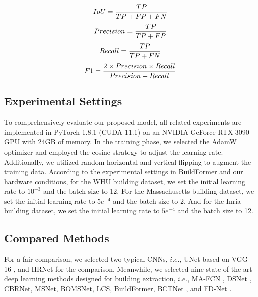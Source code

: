 \documentclass[lettersize,journal]{IEEEtran}
\begin{document}
\begin{equation}
\centering
	\label{iou} 
	\begin{split}
 IoU = \frac{TP}{TP + FP + FN}
	\end{split}
\end{equation}
\vspace{-1.0em}
\begin{equation}
\centering
	\label{Pre} 
	\begin{split}
 Precision = \frac{TP}{TP + FP}
	\end{split}
\end{equation}
\vspace{-1.0em}
\begin{equation}
\centering
	\label{Recall} 
	\begin{split}
 Recall = \frac{TP}{TP + FN}
	\end{split}
\end{equation}
\vspace{-1.0em}
\begin{equation}
\centering
	\label{F1} 
	\begin{split}
 F1 = \frac{2 \times Precision \times Recall}{Precision + Recall}
	\end{split}
\end{equation}
\vspace{-1.0em}

\subsection{Experimental Settings}
To comprehensively evaluate our proposed model, all related experiments are implemented in PyTorch 1.8.1 (CUDA 11.1) on an NVIDIA GeForce RTX 3090 GPU with 24GB of memory. In the training phase, we selected the AdamW \cite{AdamW} optimizer and employed the cosine strategy to adjust the learning rate. Additionally, we utilized random horizontal and vertical flipping to augment the training data. According to the experimental settings in BuildFormer \cite{BuildFormer} and our hardware conditions, for the WHU building dataset, we set the initial learning rate to $10^{-3}$ and the batch size to 12. For the Massachusetts building dataset, we set the initial learning rate to $5e^{-4}$ and the batch size to 2. And for the Inria building dataset, we set the initial learning rate to $5e^{-4}$ and the batch size to 12.
 
\subsection{Compared Methods}
For a fair comparison, we selected two typical CNNs, $i.e.$, UNet\cite{UNet} based on VGG-16 \cite{VGG}, and HRNet\cite{HRNet} for the comparison. Meanwhile, we selected nine state-of-the-art deep learning methods designed for building extraction, $i.e.$, MA-FCN \cite{MA_FCN}, DSNet \cite{DSNet}, CBRNet\cite{CBRNet}, MSNet\cite{MSNet}, BOMSNet\cite{BOMSC-Net}, LCS\cite{LCS}, BuildFormer\cite{BuildFormer}, BCTNet \cite{BCTNet}, and FD-Net \cite{FD-Net}.
\end{document}
